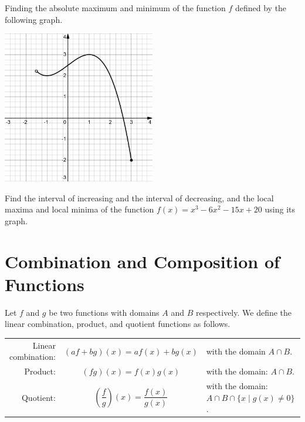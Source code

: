 \begin{exercise}
  Finding the absolute maximum and minimum of the function $f$ defined by the following graph.
  
  \begin{center}
    \raggedright\includegraphics[width=0.5\textwidth]{figs/(-x^3+3x+10)divby4.png}
  \end{center}
\end{exercise}
\vspace*{-0.5\textheight}

\begin{exercise}
  Find the interval of increasing and the interval of decreasing, and the local maxima and local minima of the function $f(x)=x^3-6x^2-15x+20$ using its graph.
\end{exercise}

\newpage

\section{Combination and Composition of Functions}

\begin{definition}
  Let \(f\) and \(g\) be two functions with domains $A$ and $B$ respectively. We define the linear combination, product, and quotient functions as follows.
  \begin{center}
    \begin{tabular}{rcl}
      Linear combination: & $(af+bg)(x)=af(x)+bg(x)$ & with the domain $A\cap B$.\\
      Product: & $(fg)(x)=f(x)g(x)$ & with the domain: $A\cap B$.\\
      Quotient: & $\left(\dfrac{f}{g}\right)(x)=\dfrac{f(x)}{g(x)}$ & with the domain: $A\cap B\cap \{x\mid g(x)\neq 0\}$.
    \end{tabular}
  \end{center}
  
\end{definition}


